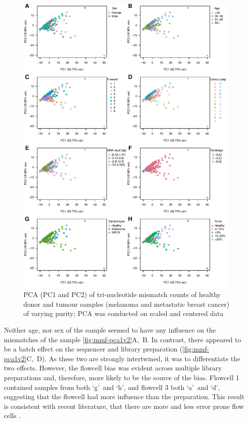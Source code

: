 \begin{figure}[htp]
\centering
\includegraphics[width=.99\linewidth]{Figures/MisMatchFinder/countPCAsPC1vsPC2.pdf}
\caption[PCA of tri-nucleotide mismatch counts of real world data (PC1 and PC2)]{PCA (PC1 and PC2) of tri-nucleotide mismatch counts of healthy donor and tumour samples (melanoma and metastatic breast cancer) of varying purity; PCA was conducted on scaled and centered data}\label{fig:mmf-pca1v2}
\end{figure}


Neither  age, nor sex of the sample seemed to have any influence on the mismatches of the sample \autoref{fig:mmf-pca1v2}A,~B. In contrast, there appeared to be a batch effect  on the sequencer and library preparation (\autoref{fig:mmf-pca1v2}C,~D). As these two are strongly intertwined, it was  to differentiate the two effects. However, the flowcell bias was evident across multiple library preparations and, therefore, more likely to be the source of the bias. Flowcell 1 contained samples from both \lq g\rq\ and \lq h\rq, and  flowcell 3 both \lq a\rq\ and \lq d\rq, suggesting that the flowcell had more influence than the preparation. This result is consistent with recent literature,  that there are more and less error prone flow cells \cite{Stoler2021}.


